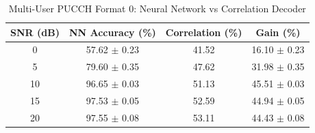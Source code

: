 \begin{table}[h]
\centering
\caption{Multi-User PUCCH Format 0: Neural Network vs Correlation Decoder}
\label{tab:multi_ue_results}
\begin{tabular}{c|c|c|c}
\hline
\textbf{SNR (dB)} & \textbf{NN Accuracy (\%)} & \textbf{Correlation (\%)} & \textbf{Gain (\%)} \\
\hline
0 & 57.62 $\pm$ 0.23 & 41.52 & 16.10 $\pm$ 0.23 \\
5 & 79.60 $\pm$ 0.35 & 47.62 & 31.98 $\pm$ 0.35 \\
10 & 96.65 $\pm$ 0.03 & 51.13 & 45.51 $\pm$ 0.03 \\
15 & 97.53 $\pm$ 0.05 & 52.59 & 44.94 $\pm$ 0.05 \\
20 & 97.55 $\pm$ 0.08 & 53.11 & 44.43 $\pm$ 0.08 \\
\hline
\end{tabular}
\end{table}
